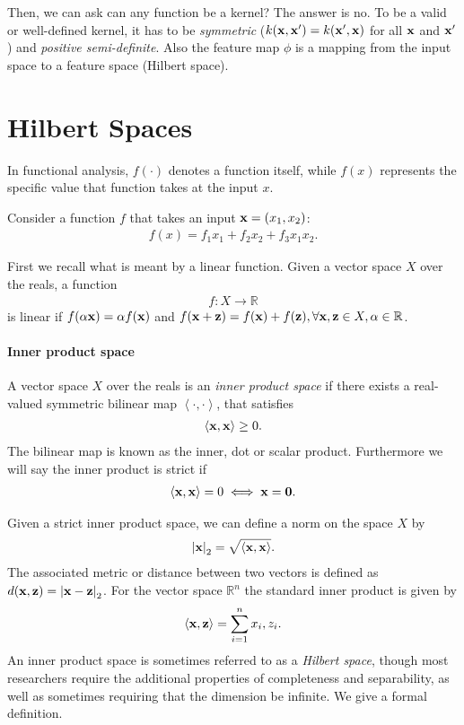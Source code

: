 Then, we can ask can any function be a kernel? The answer is no. To be a valid or well-defined kernel, it has to be \textit{symmetric} (\ie  $k({\mathbf{x}}, {\mathbf{x}}') = k({\mathbf{x}}', {\mathbf{x}})$ for all ${\mathbf{x}}$ and ${\mathbf{x}}'$) and \textit{positive semi-definite}. Also the feature map $\phi$ is a mapping from the input space to a feature space (\ie Hilbert space).


\section{Hilbert Spaces}
In functional analysis, $f(\cdot)$ denotes a function itself, while $f(x)$ represents the specific value that function takes at the input $x$.

Consider a function $f$ that takes an input ${\mathbf{x}} = (x_1, x_2)$:
\begin{align*}
	f(x) = f_1x_1+f_2x_2+f_3x_1x_2.
\end{align*}

First we recall what is meant by a linear function. Given a vector space $X$ over the reals, a function
\begin{align*}
	f: X\longrightarrow \mathbb{R}
\end{align*}
is linear if $f(\alpha{\mathbf{x}}) = \alpha f({\mathbf{x}})$ and $f({\mathbf{x}}+{\mathbf{z}}) = f({\mathbf{x}})+ f({\mathbf{z}}), \forall {\mathbf{x}},{\mathbf{z}} \in X, \alpha\in \mathbb{R}$. 

\paragraph{Inner product space} A vector space $X$ over the reals  is an \textit{inner product space} if there exists a real-valued symmetric bilinear map $\left<\cdot, \cdot\right>$, that satisfies
\begin{align*}
	\left<{\mathbf{x}},{\mathbf{x}}\right>\geq 0.
\end{align*}
The bilinear map is known as the inner, dot or scalar product. Furthermore we will say the inner product is strict if 
\begin{align*}
	\left<{\mathbf{x}}, {\mathbf{x}}\right>=0 \iff {\mathbf{x}}=\mathbf{0}.
\end{align*}

Given a strict inner product space, we can define a norm on the space $X$ by 
\begin{align*}
	\left|{\mathbf{x}}\right|_2=\sqrt{\left<{\mathbf{x}}, {\mathbf{x}}\right>}.
\end{align*}
The associated metric or distance between two vectors is defined as $d({\mathbf{x}}, {\mathbf{z}}) = \left|{\mathbf{x}}-{\mathbf{z}}\right|_2$. For the vector space $\mathbb{R}^n$ the standard inner product is given by 
\begin{align*}
	\left<{\mathbf{x}}, {\mathbf{z}}\right> = \sum_{i=1}^n x_i,z_i.
\end{align*}
An inner product space is sometimes referred to as a \textit{Hilbert space}, though most researchers require the additional properties of completeness and separability, as well as sometimes requiring that the dimension be infinite. We give a formal definition.

